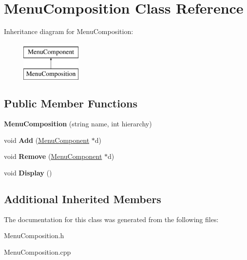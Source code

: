 \hypertarget{classMenuComposition}{\section{Menu\-Composition Class Reference}
\label{classMenuComposition}
}
Inheritance diagram for Menu\-Composition\-:\begin{figure}[H]
\begin{center}
\leavevmode
\includegraphics[height=2.000000cm]{classMenuComposition}
\end{center}
\end{figure}
\subsection*{Public Member Functions}
\begin{DoxyCompactItemize}
\item 
\hypertarget{classMenuComposition_aa8b77abb0d25ed9827bccca6e10bc396}{{\bfseries Menu\-Composition} (string name, int hierarchy)}\label{classMenuComposition_aa8b77abb0d25ed9827bccca6e10bc396}

\item 
\hypertarget{classMenuComposition_adc8165554a65bac3e2386895c5a6dfac}{void {\bfseries Add} (\hyperlink{classMenuComponent}{Menu\-Component} $\ast$d)}\label{classMenuComposition_adc8165554a65bac3e2386895c5a6dfac}

\item 
\hypertarget{classMenuComposition_a83f4e293743f306e960c3c1cf0b920ce}{void {\bfseries Remove} (\hyperlink{classMenuComponent}{Menu\-Component} $\ast$d)}\label{classMenuComposition_a83f4e293743f306e960c3c1cf0b920ce}

\item 
\hypertarget{classMenuComposition_a5f94b452c1a15c43e744ad72e1fb3895}{void {\bfseries Display} ()}\label{classMenuComposition_a5f94b452c1a15c43e744ad72e1fb3895}

\end{DoxyCompactItemize}
\subsection*{Additional Inherited Members}


The documentation for this class was generated from the following files\-:\begin{DoxyCompactItemize}
\item 
Menu\-Composition.\-h\item 
Menu\-Composition.\-cpp\end{DoxyCompactItemize}
